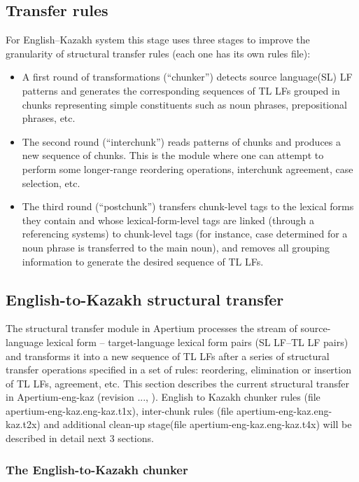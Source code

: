 \documentclass[11pt]{article}
\begin{document}
\subsection{Transfer rules}

For English–Kazakh system this stage uses three stages to improve the granularity of structural transfer rules (each one has its own rules file):
\begin{itemize}
\item A first round of transformations (“chunker”) detects source language(SL) LF patterns and generates the corresponding sequences of TL LFs grouped in chunks representing simple constituents such as noun phrases, prepositional phrases, etc. 
\item The second round (“interchunk”) reads patterns of chunks and produces a new sequence of chunks. This is the module where one can attempt to perform some longer-range reordering operations, interchunk agreement, case selection, etc. 
\item The third round (“postchunk”) transfers chunk-level tags to the lexical forms they contain and whose lexical-form-level tags are linked (through a referencing systems) to chunk-level tags (for instance, case determined for a noun phrase is transferred to the main noun), and removes all grouping information to generate the desired sequence of TL LFs.
\end{itemize}

\subsection{English-to-Kazakh structural transfer}

The structural transfer module in Apertium processes the stream of source-language lexical form – target-language lexical form pairs (SL LF–TL LF pairs) and transforms it into a new sequence of TL LFs after a series of structural transfer operations specified in a set of rules: reordering, elimination or insertion of TL LFs, agreement, etc. 
This section describes the current structural transfer in Apertium-eng-kaz (revision ..., ). English to Kazakh chunker rules (file apertium-eng-kaz.eng-kaz.t1x), inter-chunk rules (file apertium-eng-kaz.eng-kaz.t2x) and additional clean-up stage(file apertium-eng-kaz.eng-kaz.t4x) will be described in detail next 3 sections. 

\subsubsection{The English-to-Kazakh chunker}
\end{document}
